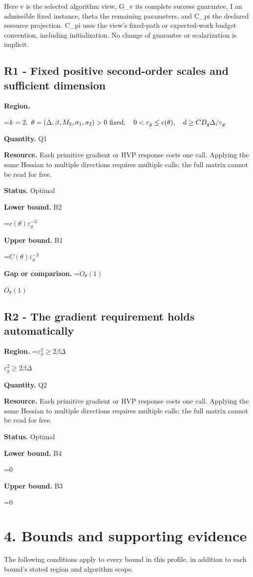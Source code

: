 \documentclass[10pt,a4paper]{article}
\newcommand{\AtlasMath}[1]{\par\begingroup\centering\setbox0=\hbox{$\displaystyle #1$}\ifdim\wd0>1.4\linewidth\typeout{ATLAS WIDE FORMULA: \the\wd0}\fi\ifdim\wd0>\linewidth\resizebox{\linewidth}{!}{\box0}\else\box0\fi\par\endgroup}
\newcommand{\AtlasInlineMath}[1]{\begingroup\setbox0=\hbox{$#1$}\ifdim\wd0>.4\linewidth\endgroup\AtlasMath{#1}\else\endgroup$#1$\fi}
\begin{document}
Here v is the selected algorithm view, G\_v its complete success guarantee, I an admissible fixed instance, theta the remaining parameters, and C\_pi the declared resource projection. C\_pi uses the view's fixed-path or expected-work budget convention, including initialization. No change of guarantee or scalarization is implicit.

\subsection{R1 - Fixed positive second-order scales and sufficient dimension}
\textbf{Region.} 
\AtlasMath{k=2,\ \theta=(\Delta,\beta,M_2,\sigma_1,\sigma_2)>0\ {\rm fixed},\quad0<\varepsilon_g\le c(\theta),\quad d\ge C D_g\Delta/\varepsilon_g}


\textbf{Quantity.} Q1

\textbf{Resource.} Each primitive gradient or HVP response costs one call. Applying the same Hessian to multiple directions requires multiple calls; the full matrix cannot be read for free.

\textbf{Status.} Optimal

\textbf{Lower bound.} B2

\AtlasMath{c(\theta)\varepsilon_g^{-3}}
\textbf{Upper bound.} B1

\AtlasMath{C(\theta)\varepsilon_g^{-3}}
\textbf{Gap or comparison.} \AtlasInlineMath{O_\theta(1)}

\subsection{R2 - The gradient requirement holds automatically}
\textbf{Region.} \AtlasInlineMath{\varepsilon_g^2\ge2\beta\Delta}

\textbf{Quantity.} Q2

\textbf{Resource.} Each primitive gradient or HVP response costs one call. Applying the same Hessian to multiple directions requires multiple calls; the full matrix cannot be read for free.

\textbf{Status.} Optimal

\textbf{Lower bound.} B4

\AtlasMath{0}
\textbf{Upper bound.} B3

\AtlasMath{0}
\section{4. Bounds and supporting evidence}
The following conditions apply to every bound in this profile, in addition to each bound's stated region and algorithm scope.
\end{document}
